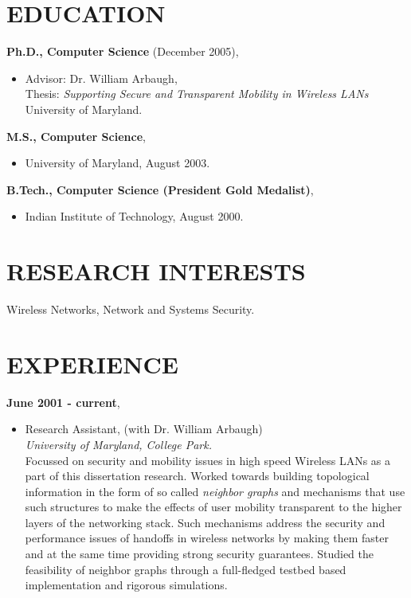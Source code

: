 \begin{resume}
\vspace{0.1in}

\section{EDUCATION}
\vspace{0.1in} 
{\bf Ph.D., Computer Science}  (December 2005),
    \begin{itemize}
         \item[] Advisor: Dr. William Arbaugh, \\
		 Thesis: {\em Supporting Secure and Transparent Mobility in Wireless LANs} \\
                 University of Maryland.
    \end{itemize}

{\bf M.S., Computer Science},   	
    \begin{itemize}
         \item[] University of Maryland, August 2003.
    \end{itemize}

{\bf B.Tech., Computer Science (President Gold Medalist)},
    \begin{itemize}
          \item[] Indian Institute of Technology, August 2000.
    \end{itemize}

 
\section{RESEARCH INTERESTS} 

\vspace{0.1in}
 Wireless Networks, Network and Systems Security.


\section{EXPERIENCE} 
\vspace{0.1in}
 {\bf June 2001 - current},   	
    \begin{itemize}
         \item[] Research Assistant, (with Dr. William Arbaugh)\\
                 {\em University of Maryland, College Park.}\\
		 Focussed on security and mobility issues in high speed Wireless LANs as a part of this dissertation research. 
                 Worked towards building topological information in the form
                 of so called {\em neighbor graphs} and mechanisms that use such structures to make the effects 
                 of user mobility transparent to the higher layers of the networking stack. Such mechanisms address
                 the security and performance issues of handoffs in wireless networks by making them faster and at the same time
                 providing strong security guarantees. Studied the feasibility of neighbor graphs through a full-fledged testbed
		 based implementation and rigorous simulations.


\end{itemize}
\end{resume}

